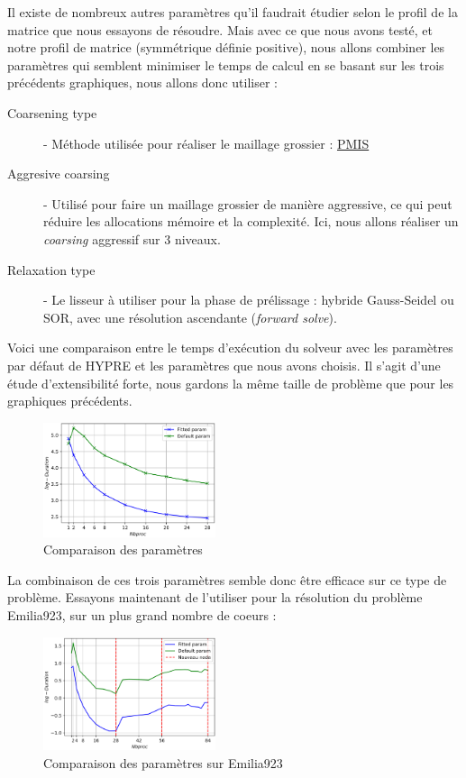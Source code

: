 \documentclass[10pt,twocolumn,letterpaper]{article}
\begin{document}
Il existe de nombreux autres paramètres qu'il faudrait étudier selon le profil
de la matrice que nous essayons de résoudre. Mais avec ce que nous avons testé,
et notre profil de matrice (symmétrique définie positive), nous allons combiner
les paramètres qui semblent minimiser le temps de calcul en se basant sur les
trois précédents graphiques, nous allons donc utiliser :

\begin{description}
  \item[Coarsening type] - Méthode utilisée pour réaliser le maillage grossier :
\href{https://hypre.readthedocs.io/en/latest/ch-references.html#dfny2008}{PMIS}
  \item[Aggresive coarsing] - Utilisé pour faire un maillage grossier de manière
aggressive, ce qui peut réduire les allocations mémoire et la complexité. Ici, 
nous allons réaliser un \textit{coarsing} aggressif sur 3 niveaux. 
  \item[Relaxation type] - Le lisseur à utiliser pour la phase de prélissage :
hybride Gauss-Seidel ou SOR, avec une résolution ascendante (\textit{forward
solve}).
\end{description}


Voici une comparaison entre le temps d'exécution du solveur avec les  paramètres
par défaut de HYPRE et les paramètres que nous avons choisis. Il s'agit d'une
étude d'extensibilité forte, nous gardons la même taille de problème que pour
les graphiques précédents.

\begin{figure}[H]
  \centering
  \caption{Comparaison des paramètres}
  \includegraphics[width=0.45\textwidth]{fig/strong_best_param.png}
\end{figure}

La combinaison de ces trois paramètres semble donc être efficace sur ce type de
problème. Essayons maintenant de l'utiliser pour la résolution du problème
Emilia923, sur un plus grand nombre de coeurs : 

\begin{figure}[H]
  \centering
  \caption{Comparaison des paramètres sur Emilia923}
  \includegraphics[width=0.45\textwidth]{fig/strong_best_param_emilia.png}
\end{figure}
\end{document}
